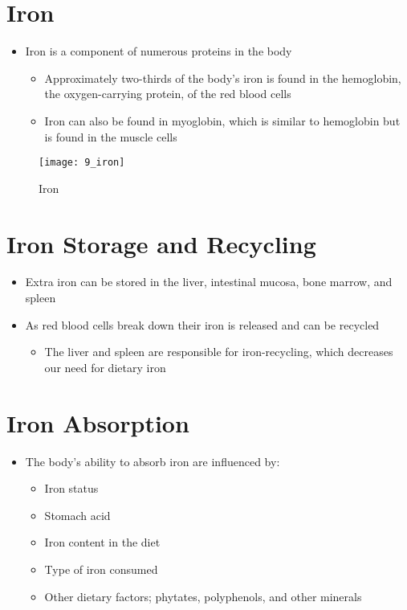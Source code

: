 \documentclass[title={Chapter 9}]{fdsn201notes}
\begin{document}
\section{Iron}\label{sec:Iron}
\begin{itemize}
	\item Iron is a component of numerous proteins in the body
	\begin{itemize}
		\item Approximately two-thirds of the body’s iron is found in the hemoglobin, the oxygen-carrying protein, of the red blood cells
		\item Iron can also be found in myoglobin, which is similar to hemoglobin but is found in the muscle cells
	\end{itemize}
\end{itemize}

\begin{figure}[H]
	\centering
	\texttt{[image: 9\_iron]}
	\caption{Iron}
	\label{fig:iron}
\end{figure}

\section{Iron Storage and Recycling}\label{sec:iron-storage-and-recycling}
\begin{itemize}
	\item Extra iron can be stored in the liver, intestinal mucosa, bone marrow, and spleen
	\item As red blood cells break down their iron is released and can be recycled
	\begin{itemize}
		\item The liver and spleen are responsible for iron-recycling, which decreases our need for dietary iron
	\end{itemize}
\end{itemize}

\section{Iron Absorption}\label{sec:iron-absorption}
\begin{itemize}
	\item The body’s ability to absorb iron are influenced by:
	\begin{itemize}
		\item Iron status
		\item Stomach acid
		\item Iron content in the diet
		\item Type of iron consumed
		\item Other dietary factors; phytates, polyphenols, and other minerals
	\end{itemize}
\end{itemize}
\end{document}
